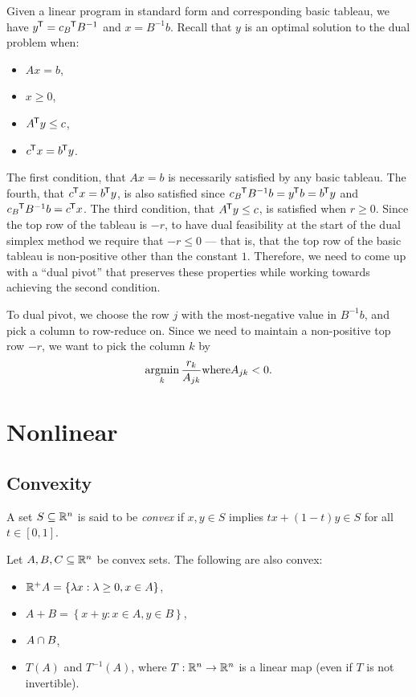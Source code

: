 Given a linear program in standard form and corresponding basic tableau, we have ${y}^{\mkern-1.5mu\mathsf{T}} = {c_B}^{\mkern-1.5mu\mathsf{T}}B^{-1}$ and $x = B^{-1}b$. Recall that $y$ is an optimal solution to the dual problem when:
\begin{itemize}
    \item $Ax = b$,
    \item $x \geq 0$,
    \item ${A}^{\mkern-1.5mu\mathsf{T}}y \leq c$,
    \item ${c}^{\mkern-1.5mu\mathsf{T}}x = {b}^{\mkern-1.5mu\mathsf{T}}y$.
\end{itemize}

The first condition, that $Ax = b$ is necessarily satisfied by any basic tableau. The fourth, that ${c}^{\mkern-1.5mu\mathsf{T}}x = {b}^{\mkern-1.5mu\mathsf{T}}y$, is also satisfied since ${c_B}^{\mkern-1.5mu\mathsf{T}}B^{-1}b = {y}^{\mkern-1.5mu\mathsf{T}}b = {b}^{\mkern-1.5mu\mathsf{T}}y$ and ${c_B}^{\mkern-1.5mu\mathsf{T}}B^{-1}b = {c}^{\mkern-1.5mu\mathsf{T}}x$. The third condition, that ${A}^{\mkern-1.5mu\mathsf{T}}y \leq c$, is satisfied when $r \geq 0$. Since the top row of the tableau is $-r$, to have dual feasibility at the start of the dual simplex method we require that $-r \leq 0$ --- that is, that the top row of the basic tableau is non-positive other than the constant $1$. Therefore, we need to come up with a ``dual pivot'' that preserves these properties while working towards achieving the second condition.

To dual pivot, we choose the row $j$ with the most-negative value in $B^{-1}b$, and pick a column to row-reduce on. Since we need to maintain a non-positive top row $-r$, we want to pick the column $k$ by \[\operatorname*{argmin}_{k}\frac{r_k}{A_{jk}} \mathrm{ where } A_{jk} < 0.\]

\section{Nonlinear}

\subsection{Convexity}

\begin{defn}
    A set $S \subseteq \mathbb{R}^n$ is said to be \emph{convex} if $x, y \in S$ implies $tx + (1-t)y \in S$ for all $t \in [0, 1]$.
\end{defn}

\begin{lemma}\label{lemma:convex-sets}
    Let $A, B, C \subseteq \mathbb{R}^n$ be convex sets. The following are also convex:
    \begin{itemize}
        \item $\mathbb{R}^{+}A = \left\{\lambda x : \lambda \geq 0, x \in A\right\}$,
        \item $A + B = \left\{x + y : x \in A, y \in B\right\}$,
        \item $A \cap B$,
        \item $T(A)$ and $T^{-1}(A)$, where $T: \mathbb{R}^n \to \mathbb{R}^n$ is a linear map (even if $T$ is not invertible).
    \end{itemize}
\end{lemma}

